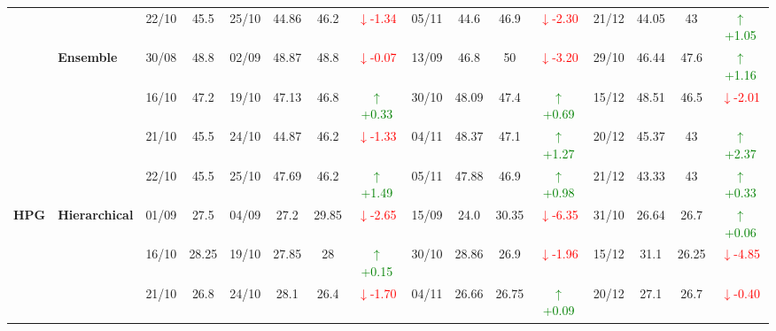 {\begin{longtable}{llcc|cccc|cccc|cccc}
&
& 22/10 & 45.5 & 25/10 & 44.86 & 46.2 & \textcolor{red}{\(\downarrow\)-1.34} & 05/11 & 44.6 & 46.9 & \textcolor{red}{\(\downarrow\)-2.30} & 21/12 & 44.05 & 43 & \textcolor{green}{\(\uparrow\)+1.05} \\
\cmidrule(lr){2-16}



& \textbf{Ensemble}
& 30/08 & 48.8 & 02/09 & 48.87 & 48.8 & \textcolor{red}{\(\downarrow\)-0.07} & 13/09 & 46.8 & 50 & \textcolor{red}{\(\downarrow\)-3.20} & 29/10 & 46.44 & 47.6 & \textcolor{green}{\(\uparrow\)+1.16} \\

&
& 16/10 & 47.2 & 19/10 & 47.13 & 46.8 & \textcolor{green}{\(\uparrow\)+0.33} & 30/10 & 48.09 & 47.4 & \textcolor{green}{\(\uparrow\)+0.69} & 15/12 & 48.51 & 46.5 & \textcolor{red}{\(\downarrow\)-2.01} \\

&
& 21/10 & 45.5 & 24/10 & 44.87 & 46.2 & \textcolor{red}{\(\downarrow\)-1.33} & 04/11 & 48.37 & 47.1 & \textcolor{green}{\(\uparrow\)+1.27} & 20/12 & 45.37 & 43 & \textcolor{green}{\(\uparrow\)+2.37} \\

&
& 22/10 & 45.5 & 25/10 & 47.69 & 46.2 & \textcolor{green}{\(\uparrow\)+1.49} & 05/11 & 47.88 & 46.9 & \textcolor{green}{\(\uparrow\)+0.98} & 21/12 & 43.33 & 43 & \textcolor{green}{\(\uparrow\)+0.33} \\
\midrule


\multirow{12}{*}{\textbf{HPG}} 
& \textbf{Hierarchical}
& 01/09 & 27.5 & 04/09 & 27.2 & 29.85 & \textcolor{red}{\(\downarrow\)-2.65} & 15/09 & 24.0 & 30.35 & \textcolor{red}{\(\downarrow\)-6.35} & 31/10 & 26.64 & 26.7 & \textcolor{green}{\(\uparrow\)+0.06} \\

& 
& 16/10 & 28.25 & 19/10 & 27.85 & 28 & \textcolor{green}{\(\uparrow\)+0.15} & 30/10 & 28.86 & 26.9 & \textcolor{red}{\(\downarrow\)-1.96} & 15/12 & 31.1 & 26.25 & \textcolor{red}{\(\downarrow\)-4.85} \\

& 
& 21/10 & 26.8 & 24/10 & 28.1 & 26.4 & \textcolor{red}{\(\downarrow\)-1.70} & 04/11 & 26.66 & 26.75 & \textcolor{green}{\(\uparrow\)+0.09} & 20/12 & 27.1 & 26.7 & \textcolor{red}{\(\downarrow\)-0.40} \\


\end{longtable}}
